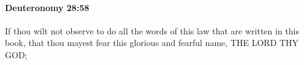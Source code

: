 
		\paragraph{Deuteronomy 28:58} %
			\label{DEUTERONOMY-28-58}

			If thou wilt not observe to do all the words of this law that are written in this book, that thou mayest fear this glorious and fearful name, THE LORD THY GOD;


